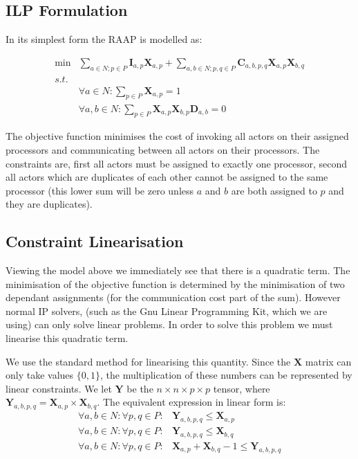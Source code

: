 \subsection{ILP Formulation}

In its simplest form the RAAP is modelled as:

\begin{align}
	\nonumber \min & \sum_{a \in N; p \in P} \mathbf{I}_{a,p}\mathbf{X}_{a,p} + \sum_{a,b \in N; p,q \in P} \mathbf{C}_{a,b,p,q}\mathbf{X}_{a,p}\mathbf{X}_{b,q} \\
	\nonumber s.t. &  \\
	\nonumber & \forall a \in N : \sum_{p \in P}\mathbf{X}_{a,p} = 1 \\
	\nonumber & \forall a,b \in N : \sum_{p \in P}\mathbf{X}_{a,p}\mathbf{X}_{b,p}\mathbf{D}_{a,b} = 0
\end{align}

The objective function minimises the cost of invoking all actors on their assigned processors and communicating between all actors on their processors.
The constraints are, first all actors must be assigned to exactly one processor, second all actors which are duplicates of each other cannot be assigned to the same processor (this lower sum will be zero unless $a$ and $b$ are both assigned to $p$ and they are duplicates).

\subsection{Constraint Linearisation}
\label{secModLin}

Viewing the model above we immediately see that there is a quadratic term.
The minimisation of the objective function is determined by the minimisation of two dependant assignments (for the communication cost part of the sum).
However normal IP solvers, (such as the Gnu Linear Programming Kit, which we are using) can only solve linear problems.
In order to solve this problem we must linearise this quadratic term.

We use the standard method for linearising this quantity.
Since the $\mathbf{X}$ matrix can only take values $\{0, 1\}$, the multiplication of these numbers can be represented by linear constraints.
We let $\mathbf{Y}$ be the $n \times n \times p \times p$ tensor, where $\mathbf{Y}_{a,b,p,q} = \mathbf{X}_{a,p} \times \mathbf{X}_{b,q}$.
The equivalent expression in linear form is:
\begin{align}
	\nonumber \forall a,b \in N : \forall p,q \in P : & \mathbf{Y}_{a,b,p,q} \leq \mathbf{X}_{a,p} \\
	\nonumber \forall a,b \in N : \forall p,q \in P : & \mathbf{Y}_{a,b,p,q} \leq \mathbf{X}_{b,q} \\
	\nonumber \forall a,b \in N : \forall p,q \in P : & \mathbf{X}_{a,p} + \mathbf{X}_{b,q} - 1 \leq \mathbf{Y}_{a,b,p,q}
\end{align}

